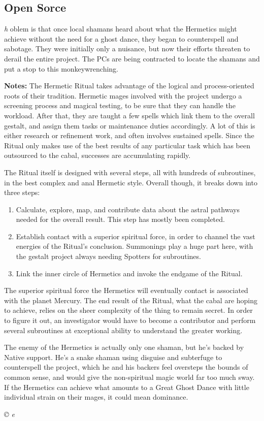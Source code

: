 \documentclass[letterpaper,onecolumn,10pt]{article}
\renewcommand{\textsc}[1]{{\fontspec{Friz Quadrata SC TT}\selectfont #1}}
\newcommand{\getyear}[1]{\StrLeft{#1}{4}}
\newenvironment{scenario}[6]
	{
		\section[#1 {\small\textsc{[#2]}}]{#1} \nopagebreak

		\noindent{\textsc{#2}}\nopagebreak

		\noindent\textit{#3}\nopagebreak
		\def\TMPSCENARIO{{\small\textit{©\getyear{#5}{} #4}}}
	}
	{\TMPSCENARIO}
\newcommand{\sectionlabel}[1]{\textbf{#1: }}
\newcommand{\notes}{\sectionlabel{Notes}}
\begin{document}
\begin{multicols}{2}
\begin{scenario}{Open Sorce}
The problem is that once local shamans heard about what the Hermetics might achieve without the need for a ghost dance, they began to counterspell and sabotage. They were initially only a nuisance, but now their efforts threaten to derail the entire project. The PCs are being contracted to locate the shamans and put a stop to this monkeywrenching.

\notes The Hermetic Ritual takes advantage of the logical and process-oriented roots of their tradition. Hermetic mages involved with the project undergo a screening process and magical testing, to be sure that they can handle the workload. After that, they are taught a few spells which link them to the overall gestalt, and assign them tasks or maintenance duties accordingly. A lot of this is either research or refinement work, and often involves sustained spells. Since the Ritual only makes use of the best results of any particular task which has been outsourced to the cabal, successes are accumulating rapidly.

The Ritual itself is designed with several steps, all with hundreds of subroutines, in the best complex and anal Hermetic style. Overall though, it breaks down into three steps:

\begin{enumerate}
\item Calculate, explore, map, and contribute data about the astral pathways needed for the overall result. This step has mostly been completed.
\item Establish contact with a superior spiritual force, in order to channel the vast energies of the Ritual's conclusion. Summonings play a huge part here, with the gestalt project always needing Spotters for subroutines.
\item Link the inner circle of Hermetics and invoke the endgame of the Ritual.
\end{enumerate}

The superior spiritual force the Hermetics will eventually contact is associated with the planet Mercury. The end result of the Ritual, what the cabal are hoping to achieve, relies on the sheer complexity of the thing to remain secret. In order to figure it out, an investigator would have to become a contributor and perform several subroutines at exceptional ability to understand the greater working.

The enemy of the Hermetics is actually only one shaman, but he's backed by Native support. He's a snake shaman using disguise and subterfuge to counterspell the project, which he and his backers feel oversteps the bounds of common sense, and would give the non-spiritual magic world far too much sway. If the Hermetics can achieve what amounts to a Great Ghost Dance with little individual strain on their mages, it could mean dominance.


\end{scenario}
\end{multicols}
\end{document}
